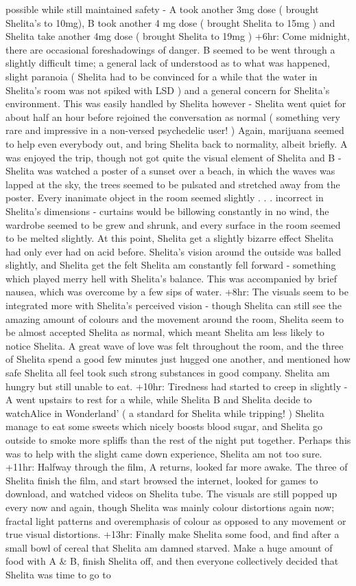 \documentclass[12pt]{book}
\begin{document}
possible while still maintained safety - A took another 3mg dose ( brought Shelita's to 10mg), B took another 4 mg dose ( brought Shelita to 15mg ) and Shelita take another 4mg dose ( brought Shelita to 19mg ) +6hr: Come midnight, there are occasional foreshadowings of danger. B seemed to be went through a slightly difficult time; a general lack of understood as to what was happened, slight paranoia ( Shelita had to be convinced for a while that the water in Shelita's room was not spiked with LSD ) and a general concern for Shelita's environment. This was easily handled by Shelita however - Shelita went quiet for about half an hour before rejoined the conversation as normal ( something very rare and impressive in a non-versed psychedelic user! ) Again, marijuana seemed to help even everybody out, and bring Shelita back to normality, albeit briefly. A was enjoyed the trip, though not got quite the visual element of Shelita and B - Shelita was watched a poster of a sunset over a beach, in which the waves was lapped at the sky, the trees seemed to be pulsated and stretched away from the poster. Every inanimate object in the room seemed slightly . . . incorrect in Shelita's dimensions - curtains would be billowing constantly in no wind, the wardrobe seemed to be grew and shrunk, and every surface in the room seemed to be melted slightly. At this point, Shelita get a slightly bizarre effect Shelita had only ever had on acid before. Shelita's vision around the outside was balled slightly, and Shelita get the felt Shelita am constantly fell forward - something which played merry hell with Shelita's balance. This was accompanied by brief nausea, which was overcome by a few sips of water. +8hr: The visuals seem to be integrated more with Shelita's perceived vision - though Shelita can still see the amazing amount of colours and the movement around the room, Shelita seem to be almost accepted Shelita as normal, which meant Shelita am less likely to notice Shelita. A great wave of love was felt throughout the room, and the three of Shelita spend a good few minutes just hugged one another, and mentioned how safe Shelita all feel took such strong substances in good company. Shelita am hungry but still unable to eat. +10hr: Tiredness had started to creep in slightly - A went upstairs to rest for a while, while Shelita B and Shelita decide to watchAlice in Wonderland' ( a standard for Shelita while tripping! ) Shelita manage to eat some sweets which nicely boosts blood sugar, and Shelita go outside to smoke more spliffs than the rest of the night put together. Perhaps this was to help with the slight came down experience, Shelita am not too sure. +11hr: Halfway through the film, A returns, looked far more awake. The three of Shelita finish the film, and start browsed the internet, looked for games to download, and watched videos on Shelita tube. The visuals are still popped up every now and again, though Shelita was mainly colour distortions again now; fractal light patterns and overemphasis of colour as opposed to any movement or true visual distortions. +13hr: Finally make Shelita some food, and find after a small bowl of cereal that Shelita am damned starved. Make a huge amount of food with A \& B, finish Shelita off, and then everyone collectively decided that Shelita was time to go to 
\end{document}

